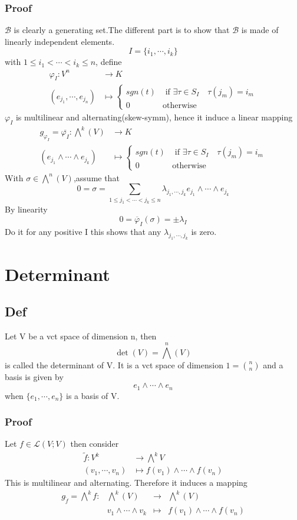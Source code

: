 \documentclass{book}
\begin{document}
\subsection{Proof}
$\mathcal{B}$ is clearly a generating set.The different part is to show that $\mathcal{B}$ is made of linearly independent elements.
$$I=\{i_1,\cdots,i_k\}$$ with $1\leq i_1<\cdots<i_k\leq n$, define
$$\begin{aligned}
    \varphi_I: V^n &\rightarrow K\\
    (e_{j_1},\cdots,e_{j_n})&\mapsto \left\{\begin{aligned}
        sgn(t) &\text{ if } \exists \tau\in S_I\quad\tau(j_m)=i_m\\
        0\quad &\text{otherwise} 
    \end{aligned}\right.
\end{aligned}$$
$\varphi_I$ is multilinear and alternating(skew-symm), hence it induce a linear mapping
$$
\begin{aligned}
    g_{\varphi_I}=\overline{\varphi_I}:\bigwedge\limits^k(V)  &\rightarrow K\\
    (e_{j_1}\wedge\cdots\wedge e_{j_k})&\mapsto \left\{\begin{aligned}
        sgn(t) &\text{ if } \exists \tau\in S_I\quad\tau(j_m)=i_m\\
        0 \quad&\text{otherwise} 
    \end{aligned}\right.
\end{aligned}
$$
With $\sigma\in\bigwedge\limits^n(V)$,assume that
$$0=\sigma=\sum\limits_{1\leq j_1<\cdots<j_k\leq n}\lambda_{j_1,\cdots,j_k}e_{j_1}\wedge\cdots\wedge e_{j_k}$$
By linearity$$0=\overline{\varphi}_I(\sigma)=\pm \lambda_I$$
Do it for any positive I this shows that any $\lambda_{j_1,\cdots,j_k}$ is zero.
\chapter{Determinant}
\section{Def}
Let V be a vct space of dimension n, then 
$$\det(V)=\bigwedge\limits^n(V)$$
is called the determinant of V. It is a vct space of dimension $1=\binom{n}{n}$ and a basis is given by $$e_1\wedge\cdots\wedge e_n$$
when $\{e_1,\cdots,e_n\}$ is a basis of V.
\subsection{Proof}
Let $f\in \mathscr{L}(V;V)$ then consider
$$\begin{aligned}
    \widetilde{f}: V^k &\rightarrow \bigwedge\limits^k V\\ 
    (v_1,\cdots,v_n) &\mapsto f(v_1)\wedge\cdots\wedge f(v_n)
\end{aligned}$$
This is multilinear and alternating. Therefore it induces a mapping
$$
\begin{aligned}
    g_{\widetilde{f}}=\bigwedge\limits^kf: &\bigwedge\limits^k(V) &\rightarrow &\bigwedge\limits^k(V)\\
    &v_1\wedge\cdots\wedge v_k &\mapsto & f(v_1)\wedge\cdots\wedge f(v_n)
\end{aligned}$$
\end{document}
